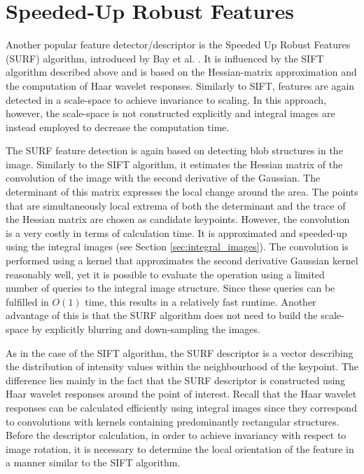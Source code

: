 \section{Speeded-Up Robust Features}

Another popular feature detector/descriptor is the Speeded Up Robust Features (SURF) algorithm, introduced by Bay et al. \cite{surf2006}. 
It is influenced by the SIFT algorithm described above and is based on the Hessian-matrix approximation and the computation of Haar wavelet responses. 
Similarly to SIFT, features are again detected in a scale-space to achieve invariance to scaling.
In this approach, however, the scale-space is not constructed explicitly and integral images are instead employed to decrease the computation time. 

The SURF feature detection is again based on detecting blob structures in the image. 
Similarly to the SIFT algorithm, it estimates the Hessian matrix of the convolution of the image with the second derivative of the Gaussian.
The determinant of this matrix expresses the local change around the area.
The points that are simultaneously local extrema of both the determinant and the trace of the Hessian matrix are chosen as candidate keypoints.
However, the convolution is a very costly in terms of calculation time.
It is approximated and speeded-up using the integral images (see Section \ref{sec:integral_images}).
The convolution is performed using a kernel that approximates the second derivative Gaussian kernel reasonably well, yet it is possible to evaluate the operation using a limited number of queries to the integral image structure. 
Since these queries can be fulfilled in $O(1)$ time, this results in a relatively fast runtime. 
Another advantage of this is that the SURF algorithm does not need to build the scale-space by explicitly blurring and down-sampling the images.

As in the case of the SIFT algorithm, the SURF descriptor is a vector describing the distribution of intensity values within the neighbourhood of the keypoint. 
The difference lies mainly in the fact that the SURF descriptor is constructed using Haar wavelet responses around the point of interest. 
Recall that the Haar wavelet responses can be calculated efficiently using integral images since they correspond to convolutions with kernels containing predominantly rectangular structures. 
Before the descriptor calculation, in order to achieve invariancy with respect to image rotation, it is necessary to determine the local orientation of the feature in a manner similar to the SIFT algorithm. 

